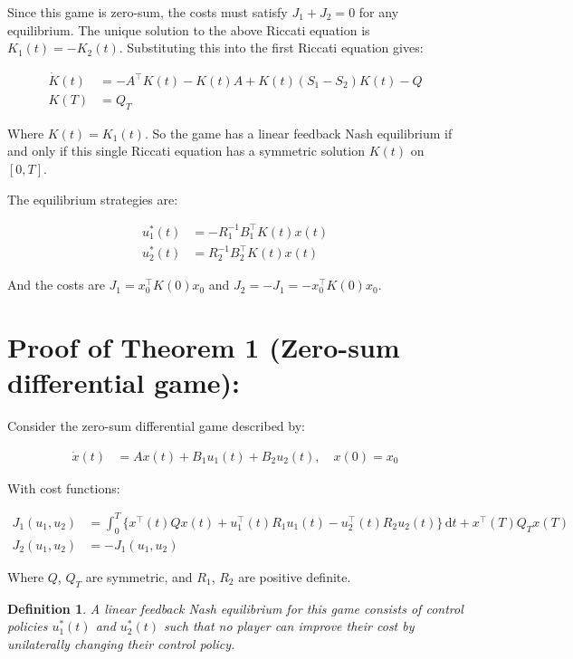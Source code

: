 \documentclass[3p]{elsarticle}
\newtheorem{definition}{Definition}
\begin{document}
Since this game is zero-sum, the costs must satisfy $J_1 + J_2 = 0$ for any equilibrium. The unique solution to the above Riccati equation is $K_1(t) = -K_2(t)$. Substituting this into the first Riccati equation gives:

\begin{align*} 
\dot{K}(t) &= -A^\top K(t) - K(t)A + K(t)(S_1-S_2)K(t) - Q \\
K(T) &= Q_T
\end{align*}

Where $K(t) = K_1(t)$. So the game has a linear feedback Nash equilibrium if and only if this single Riccati equation has a symmetric solution $K(t)$ on $[0,T]$. 

The equilibrium strategies are:

\begin{align*}
u_1^*(t) &= -R_1^{-1}B_1^\top K(t) x(t) \\ 
u_2^*(t) &= R_2^{-1}B_2^\top K(t) x(t)
\end{align*}

And the costs are $J_1 = x_0^\top K(0) x_0$ and $J_2 = -J_1 = -x_0^\top K(0) x_0$.







\section*{Proof of Theorem 1 (Zero-sum differential game):}

Consider the zero-sum differential game described by:

\begin{align*}
\dot{x}(t) &= Ax(t) + B_1u_1(t) + B_2u_2(t), \quad x(0)=x_0
\end{align*}

With cost functions:

\begin{align*}
J_1(u_1,u_2) &= \int_0^T \{x^\top (t)Qx(t) + u_1^\top(t) R_1u_1(t) - u_2^\top(t)R_2u_2(t)\}\,\mathrm{d}t + x^\top(T)Q_Tx(T) \\
J_2(u_1,u_2) &= -J_1(u_1,u_2)
\end{align*}

Where $Q$, $Q_T$ are symmetric, and $R_1$, $R_2$ are positive definite.

\begin{definition}
A linear feedback Nash equilibrium for this game consists of control policies $u_1^*(t)$ and $u_2^*(t)$ such that no player can improve their cost by unilaterally changing their control policy.
\end{definition}
\end{document}
